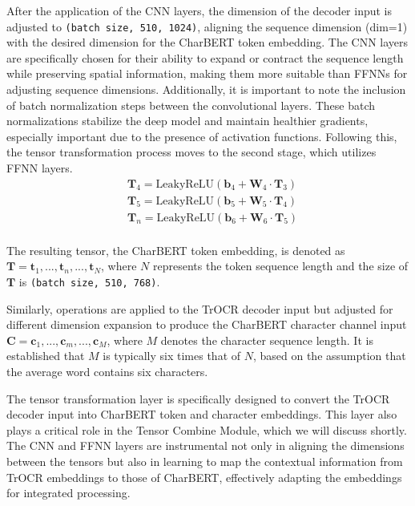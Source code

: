 After the application of the CNN layers, the dimension of the decoder input is adjusted to \texttt{(batch size, 510, 1024)}, aligning the sequence dimension (dim=1) with the desired dimension for the CharBERT token embedding. The CNN layers are specifically chosen for their ability to expand or contract the sequence length while preserving spatial information, making them more suitable than FFNNs for adjusting sequence dimensions. Additionally, it is important to note the inclusion of batch normalization steps between the convolutional layers. These batch normalizations stabilize the deep model and maintain healthier gradients, especially important due to the presence of activation functions. Following this, the tensor transformation process moves to the second stage, which utilizes FFNN layers.
\begin{equation} \label{eq:3_tensor_transform_ffnn}
    \begin{split}
        &\mathbf{T}_{4} = \text{LeakyReLU}(\mathbf{b}_4 + \mathbf{W}_4\cdot \mathbf{T}_{3})\\
        &\mathbf{T}_{5} = \text{LeakyReLU}(\mathbf{b}_5 + \mathbf{W}_5\cdot \mathbf{T}_{4})\\
        &\mathbf{T}_{n} = \text{LeakyReLU}(\mathbf{b}_6 + \mathbf{W}_6\cdot \mathbf{T}_{5})\\
    \end{split}
\end{equation}

The resulting tensor, the CharBERT token embedding, is denoted as $\mathbf{T} = {\mathbf{t}_1, ..., \mathbf{t}_n, ..., \mathbf{t}_N}$, where $N$ represents the token sequence length and the size of $\mathbf{T}$ is \texttt{(batch size, 510, 768)}.

Similarly, operations are applied to the TrOCR decoder input but adjusted for different dimension expansion to produce the CharBERT character channel input $\mathbf{C} = {\mathbf{c}_1, ..., \mathbf{c}_m, ..., \mathbf{c}_M}$, where $M$ denotes the character sequence length. It is established that $M$ is typically six times that of $N$, based on the assumption that the average word contains six characters.

The tensor transformation layer is specifically designed to convert the TrOCR decoder input into CharBERT token and character embeddings. This layer also plays a critical role in the Tensor Combine Module, which we will discuss shortly. The CNN and FFNN layers are instrumental not only in aligning the dimensions between the tensors but also in learning to map the contextual information from TrOCR embeddings to those of CharBERT, effectively adapting the embeddings for integrated processing.

